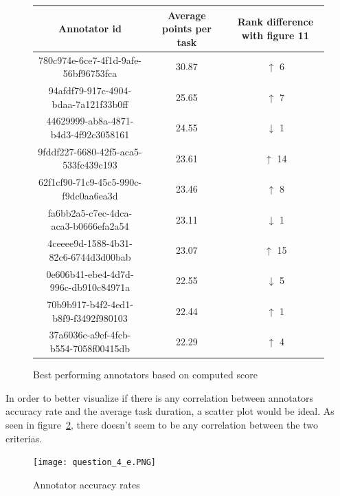 \documentclass[letterpaper,12pt]{article}
\begin{document}
\renewcommand\thefigure{12}
\begin{figure}[hb] 
\centering
        \begin{tabular}{|ccc|} 
\hline
\multicolumn{1}{|c}{Annotator id} & \multicolumn{1}{c}{Average points per task}  & \multicolumn{1}{c|}{Rank difference with figure 11} \\
\hline
780c974e-6ce7-4f1d-9afe-56bf96753fca & 30.87 & $\uparrow$ 6 \\
94afdf79-917c-4904-bdaa-7a121f33b0ff & 25.65 & $\uparrow$ 7 \\
44629999-ab8a-4871-b4d3-4f92c3058161 & 24.55 & $\downarrow$ 1 \\
9fddf227-6680-42f5-aca5-533fc439c193 & 23.61 & $\uparrow$ 14 \\
62f1cf90-71c9-45c5-990c-f9dc0aa6ea3d & 23.46 & $\uparrow$ 8 \\
fa6bb2a5-c7ec-4dca-aca3-b0666efa2a54 & 23.11 & $\downarrow$ 1 \\
4ceeee9d-1588-4b31-82c6-6744d3d00bab & 23.07 & $\uparrow$ 15 \\
0e606b41-ebe4-4d7d-996c-db910c84971a & 22.55 & $\downarrow$ 5 \\
70b9b917-b4f2-4ed1-b8f9-f3492f980103 & 22.44 & $\uparrow$ 1 \\
37a6036c-a9ef-4fcb-b554-7058f00415db & 22.29 & $\uparrow$ 4 \\
\hline
\end{tabular}
        \caption{
                \label{fig:question_4_d}
                Best performing annotators based on computed score
        }
\end{figure}

\newpage
In order to better visualize if there is any correlation between annotators accuracy rate and the average task duration, a scatter plot would be ideal. As seen in figure~\ref{fig:question_4_e}, there doesn't seem to be any correlation between the two criterias.

\renewcommand\thefigure{13}
\begin{figure}[hb] 
        \centering \texttt{[image: question\_4\_e.PNG]}
        \caption{
                \label{fig:question_4_e}
                Annotator accuracy rates
        }
\end{figure}

\newpage
\end{document}
